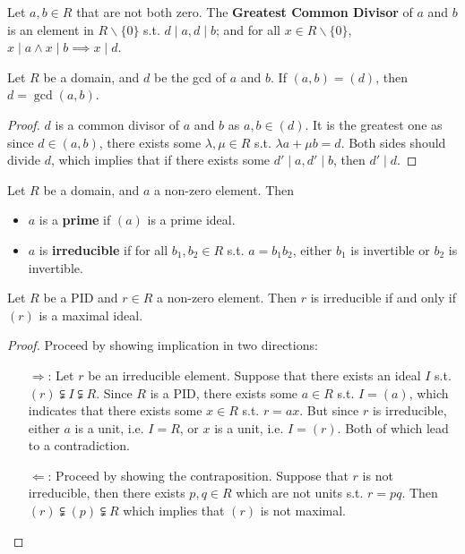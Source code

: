 \begin{definition}
    Let $a, b\in R$ that are not both zero. The \textbf{Greatest Common Divisor} of $a$ and $b$ is an element in $R\smallsetminus\{0\}$ s.t.
    $d\mid a, d\mid b$; and for all $x\in R\smallsetminus\{0\}$, $x\mid a \wedge x\mid b \implies x \mid d$.
\end{definition}

\begin{proposition}\label{prop:gcd ideal}
    Let $R$ be a domain, and $d$ be the gcd of $a$ and $b$. If $(a, b) = (d)$, then $d = \gcd(a, b)$. 
\end{proposition}

\begin{proof}
    $d$ is a common divisor of $a$ and $b$ as $a, b\in (d)$. It is the greatest one as since $d\in (a, b)$, there exists some $\lambda, \mu\in R$ s.t. $\lambda a + \mu b = d$. Both sides should divide $d$, which implies that if there exists some $d' \mid a, d'\mid b$, then $d' \mid d$.
\end{proof}

\begin{definition}
    Let $R$ be a domain, and $a$ a non-zero element. Then
    \begin{itemize}
        \item $a$ is a \textbf{prime} if $(a)$ is a prime ideal.
        \item $a$ is \textbf{irreducible} if for all $b_1, b_2\in R$ s.t. $a = b_1 b_2$, either $b_1$ is invertible or $b_2$ is invertible.
    \end{itemize}
\end{definition}

\begin{proposition}\label{prop:irreducible implies maximal}
    Let $R$ be a PID and $r\in R$ a non-zero element. Then $r$ is irreducible if and only if $(r)$ is a maximal ideal.
\end{proposition}

\begin{proof}
    Proceed by showing implication in two directions:
    \begin{itemize}
        \item[$\Rightarrow$:] Let $r$ be an irreducible element. Suppose that there exists an ideal $I$ s.t. $(r) \subsetneqq I \subsetneqq R$. Since $R$ is a PID, there exists some $a\in R$ s.t. $I = (a)$, which indicates that there exists some $x\in R$ s.t. $r = ax$. But since $r$ is irreducible, either $a$ is a unit, i.e. $I = R$, or $x$ is a unit, i.e. $I = (r)$. Both of which lead to a contradiction.
        \item[$\Leftarrow$:] Proceed by showing the contraposition. Suppose that $r$ is not irreducible, then there exists $p, q\in R$ which are not units s.t. $r = pq$. Then $(r) \subsetneqq (p) \subsetneqq R$ which implies that $(r)$ is not maximal.
    \end{itemize}
\end{proof}

